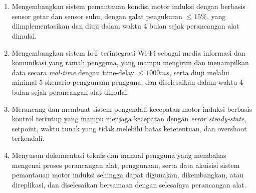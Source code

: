 \documentclass{elsinta}
\begin{document}
\section{\ObjectivesTitle}

\subsection{\MainObjectiveTitle}
\begin{enumerate}
  \item Mengembangkan sistem pemantauan kondisi motor induksi dengan berbasis sensor getar dan sensor suhu, dengan galat pengukuran $\leq 15\%$, yang diimplementasikan dan diuji dalam waktu 4 bulan sejak perancangan alat dimulai.
  \item Mengembangkan sistem IoT terintegrasi Wi-Fi sebagai media informasi dan komunikasi yang ramah pengguna, yang mampu mengirim dan menampilkan data secara \textit{real-time} dengan time-delay $\leq 1000ms$, serta diuji melalui minimal 5 skenario penggunaan pengguna, dan diselesaikan dalam waktu 4 bulan sejak perancangan alat dimulai.
  \item Merancang dan membuat sistem pengendali kecepatan motor induksi berbasis kontrol tertutup yang mampu menjaga kecepatan dengan \textit{error steady-state}, setpoint, waktu tunak yang tidak  melebihi batas ketetentuan, dan overshoot terkendali.
  \item Menyusun dokumentasi teknis dan manual pengguna yang membahas mengenai proses perancangan alat, penggunaan, serta data akuisisi sistem pemantauan motor induksi sehingga dapat digunakan, dikembangkan, atau direplikasi, dan diselesaikan bersamaan dengan selesainya perancangan alat. 
\end{enumerate}
\end{document}
